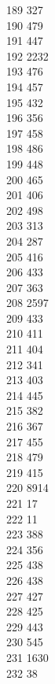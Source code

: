 { 189	327 \\
 190	479 \\
 191	447 \\
 192	2232 \\
 193	476 \\
 194	457 \\
 195	432 \\
 196	356 \\
 197	458 \\
 198	486 \\
 199	448 \\
 200	465 \\
 201	406 \\
 202	498 \\
 203	313 \\
 204	287 \\
 205	416 \\
 206	433 \\
 207	363 \\
 208	2597 \\
 209	433 \\
 210	411 \\
 211	404 \\
 212	341 \\
 213	403 \\
 214	445 \\
 215	382 \\
 216	367 \\
 217	455 \\
 218	479 \\
 219	415 \\
 220	8914 \\
 221	17 \\
 222	11 \\
 223	388 \\
 224	356 \\
 225	438 \\
 226	438 \\
 227	427 \\
 228	425 \\
 229	443 \\
 230	545 \\
 231	1630 \\
 232	38 \\
}
